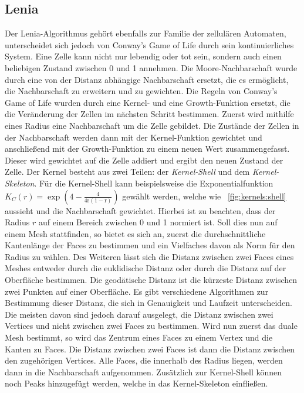 \subsection{Lenia}
Der Lenia-Algorithmus gehört ebenfalls zur Familie der zellulären Automaten, unterscheidet sich jedoch von Conway's Game of Life durch sein kontinuierliches System.
Eine Zelle kann nicht nur lebendig oder tot sein, sondern auch einen beliebigen Zustand zwischen 0 und 1 annehmen.
Die Moore-Nachbarschaft wurde durch eine von der Distanz abhängige Nachbarschaft ersetzt, die es ermöglicht, die Nachbarschaft zu erweitern und zu gewichten.
Die Regeln von Conway's Game of Life wurden durch eine Kernel- und eine Growth-Funktion ersetzt, die die Veränderung der Zellen im nächsten Schritt bestimmen.
Zuerst wird mithilfe eines Radius eine Nachbarschaft um die Zelle gebildet.
Die Zustände der Zellen in der Nachbarschaft werden dann mit der Kernel-Funktion gewichtet und anschließend mit der Growth-Funktion zu einem neuen Wert zusammengefasst.
Dieser wird gewichtet auf die Zelle addiert und ergibt den neuen Zustand der Zelle.
Der Kernel besteht aus zwei Teilen: der \textit{Kernel-Shell} und dem \textit{Kernel-Skeleton}.
Für die Kernel-Shell kann beispielsweise die Exponentialfunktion $K_C(r) = \exp\left(\operatorname{4 - \frac{4}{4r(1-r)}}\right)$ gewählt werden, welche wie ~\autoref{fig:kernels:shell} aussieht und die Nachbarschaft gewichtet.
Hierbei ist zu beachten, dass der Radius $r$ auf einem Bereich zwischen 0 und 1 normiert ist.
Soll dies nun auf einem Mesh stattfinden, so bietet es sich an, zuerst die durchschnittliche Kantenlänge der Faces zu bestimmen und ein Vielfaches davon als Norm für den Radius zu wählen.
Des Weiteren lässt sich die Distanz zwischen zwei Faces eines Meshes entweder durch die euklidische Distanz oder durch die Distanz auf der Oberfläche bestimmen.
Die geodätische Distanz ist die kürzeste Distanz zwischen zwei Punkten auf einer Oberfläche.
Es gibt verschiedene Algorithmen zur Bestimmung dieser Distanz, die sich in Genauigkeit und Laufzeit unterscheiden.
Die meisten davon sind jedoch darauf ausgelegt, die Distanz zwischen zwei Vertices und nicht zwischen zwei Faces zu bestimmen.
Wird nun zuerst das duale Mesh bestimmt, so wird das Zentrum eines Faces zu einem Vertex und die Kanten zu Faces.
Die Distanz zwischen zwei Faces ist dann die Distanz zwischen den zugehörigen Vertices.
Alle Faces, die innerhalb des Radius liegen, werden dann in die Nachbarschaft aufgenommen.
Zusätzlich zur Kernel-Shell können noch Peaks hinzugefügt werden, welche in das Kernel-Skeleton einfließen.
